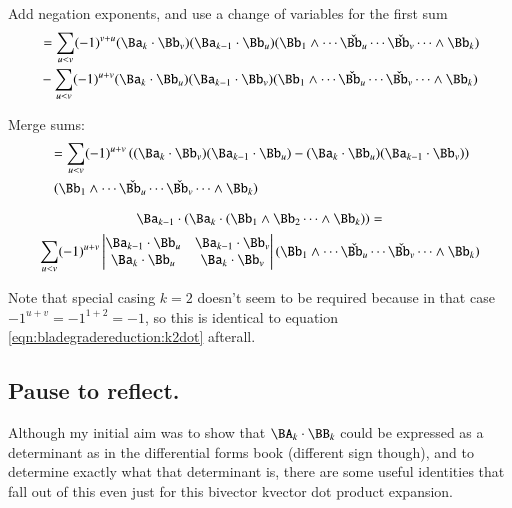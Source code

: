 Add negation exponents, and use a change of variables for the first sum
\begin{align*}
&= \sum_{u<v} (-1)^{v+u} (\Ba_k \cdot \Bb_v) (\Ba_{k-1} \cdot \Bb_u) (\Bb_1 \wedge \cdots \check{\Bb_u} \cdots \check{\Bb_v} \cdots \wedge \Bb_k) \\
&- \sum_{u<v} (-1)^{u+v} (\Ba_k \cdot \Bb_u) (\Ba_{k-1} \cdot \Bb_v) (\Bb_1 \wedge \cdots \check{\Bb_u} \cdots \check{\Bb_v} \cdots \wedge \Bb_k) \\
\end{align*}

Merge sums:
\begin{align*}
&= \sum_{u<v} (-1)^{u+v} 
\left(
(\Ba_k \cdot \Bb_v) (\Ba_{k-1} \cdot \Bb_u)
-(\Ba_k \cdot \Bb_u) (\Ba_{k-1} \cdot \Bb_v)
\right) \\
& \; (\Bb_1 \wedge \cdots \check{\Bb_u} \cdots \check{\Bb_v} \cdots \wedge \Bb_k)
\end{align*}

\begin{equation}\label{eqn:bladegradereduction:bivectordotkvector}
\Ba_{k-1} \cdot (\Ba_k \cdot (\Bb_1 \wedge \Bb_2 \cdots \wedge \Bb_k))
= 
\end{equation}
\begin{equation*}
\sum_{u<v} (-1)^{u+v} 
\begin{vmatrix}
\Ba_{k-1} \cdot \Bb_u & \Ba_{k-1} \cdot \Bb_v \\
\Ba_k \cdot \Bb_u & \Ba_k \cdot \Bb_v \\
\end{vmatrix}
(\Bb_1 \wedge \cdots \check{\Bb_u} \cdots \check{\Bb_v} \cdots \wedge \Bb_k) \\
\end{equation*}

Note that special casing $k=2$ doesn't seem to be required because in that
case $-1^{u+v} = -1^{1+2}=-1$, so this is identical to 
equation \ref{eqn:bladegradereduction:k2dot} afterall.

\subsection{Pause to reflect. }

Although my initial aim was to show that $\BA_k \cdot \BB_k$ could be
expressed as a determinant as in the differential forms book (different
sign though), and to determine exactly what that determinant is, there
are some useful identities that fall out of this even just for this
bivector kvector dot product expansion.

